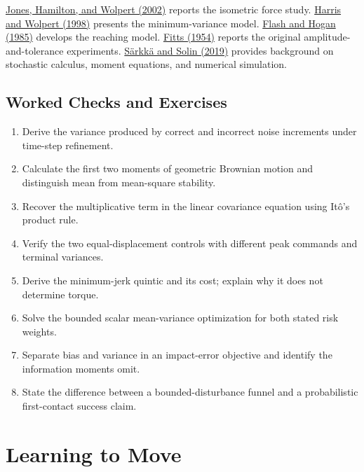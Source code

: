 \documentclass[12pt, openany]{book}
\theoremstyle{plain}
\begin{document}
\href{https://wolpertlab.neuroscience.columbia.edu/sites/default/files/content/papers/JonHamWol02.pdf}{Jones, Hamilton, and Wolpert (2002)} reports the isometric force study.
\href{https://wolpertlab.neuroscience.columbia.edu/sites/default/files/content/papers/HarWol98.pdf}{Harris and Wolpert (1998)} presents the minimum-variance model.
\href{https://pubmed.ncbi.nlm.nih.gov/4020415/}{Flash and Hogan (1985)} develops the reaching model.
\href{https://doi.org/10.1037/h0055392}{Fitts (1954)} reports the original amplitude-and-tolerance experiments.
\href{https://users.aalto.fi/~ssarkka/pub/sde_book.pdf}{Särkkä and Solin (2019)} provides background on stochastic calculus, moment equations, and numerical simulation.

\begin{samepage}
\section{Worked Checks and Exercises}

\begin{enumerate}[itemsep=0.25em,parsep=0pt]
\item Derive the variance produced by correct and incorrect noise increments under time-step refinement.
\item Calculate the first two moments of geometric Brownian motion and distinguish mean from mean-square stability.
\item Recover the multiplicative term in the linear covariance equation using Itô's product rule.
\item Verify the two equal-displacement controls with different peak commands and terminal variances.
\item Derive the minimum-jerk quintic and its cost; explain why it does not determine torque.
\item Solve the bounded scalar mean-variance optimization for both stated risk weights.
\item Separate bias and variance in an impact-error objective and identify the information moments omit.
\item State the difference between a bounded-disturbance funnel and a probabilistic first-contact success claim.
\end{enumerate}
\end{samepage}

\chapter{Learning to Move}
\label{ch:learning_to_move}
\begingroup
\raggedbottom
\end{document}
